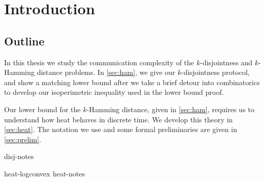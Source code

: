 \documentclass[11pt,proquest]{uwthesis}[2016/11/22]
\begin{document}
\prelimpages



\copyrightpage
\titlepage  
\setcounter{page}{-1}




\tableofcontents
\listoffigures
\listoftables
\thispagestyle{plain}
\textpages

%
\chapter{Introduction}
\newpage\newpage\newpage\newpage
\section{Outline}
In this thesis we study the communication complexity of the 
$k$-disjointness and $k$-Hamming distance problems. 
In \autoref{sec:ham}, we give our $k$-disjointness protocol,
and show a matching lower bound after we take a brief detour 
into combinatorics to develop our isoperimetric inequality used in the lower bound proof.

Our lower bound for the $k$-Hamming distance, given in \autoref{sec:ham},
requires us to understand how heat behaves in discrete time. We develop this
theory in \autoref{sec:heat}. The notation we use and some formal preliminaries
are given in \autoref{sec:prelim}.

\newpage\newpage







  {disj-notes}



  {heat-logconvex}
  {heat-notes}







\end{document}
